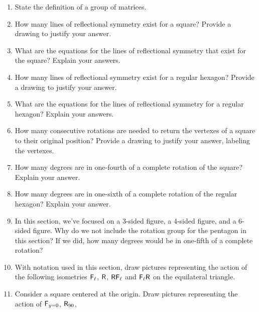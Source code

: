 \problems
\begin{enumerate}
\item State the definition of a group of matrices.
\item How many lines of reflectional symmetry exist for a square?
  Provide a drawing to justify your answer.
\item What are the equations for the lines of reflectional symmetry that exist for
  the square? Explain your answers.
\item How many lines of reflectional symmetry exist for a regular hexagon?  Provide a
  drawing to justify your answer.
\item What are the equations for the lines of reflectional symmetry
  for a regular hexagon?  Explain your answers.
\item How many consecutive rotations are needed to return the vertexes
  of a square to their original position? Provide a drawing to justify
  your answer, labeling the vertexes.
\item How many degrees are in one-fourth of a complete rotation of the
  square?  Explain your answer.
\item How many degrees are in one-sixth of a complete rotation of the
  regular hexagon?  Explain your answer.
\item In this section, we've focused on a 3-sided figure, a 4-sided
  figure, and a 6-sided figure.  Why do we not include the rotation
  group for the pentagon in this section?  If we did, how many degrees
  would be in one-fifth of a complete rotation?
\item With notation used in this section, draw pictures representing
  the action of the following isometries $\mathsf{F}_\ell$, $\mathsf{R}$,
  $\mathsf{R}\mathsf{F}_\ell$ and $\mathsf{F}_\ell\mathsf{R}$ on the equilateral
  triangle.
\item Consider a square centered at the origin. Draw pictures
  representing the action of $\mathsf{F}_{y=0}$, $\mathsf{R}_{90}$,

\end{enumerate}

